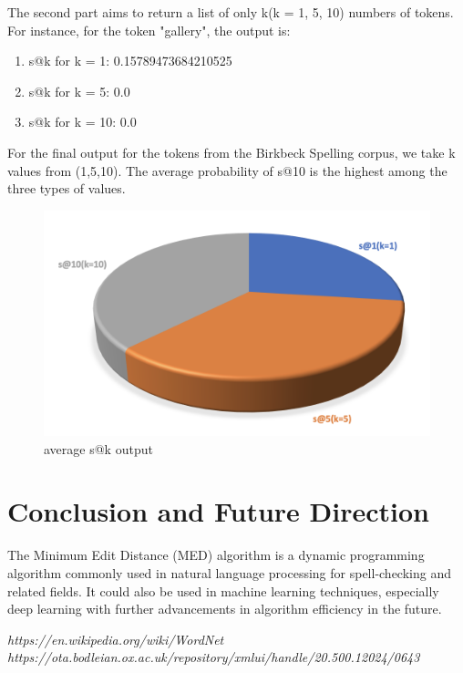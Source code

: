 \documentclass[sigconf]{acmart}
\begin{document}
The second part aims to return a list of only k(k = 1, 5, 10) numbers of tokens. For instance, for the token "gallery", the output is:
\begin{enumerate}
    \item s@k for k = 1:  0.15789473684210525
    \item s@k for k = 5:  0.0
    \item s@k for k = 10:  0.0
\end{enumerate}

For the final output for the tokens from the Birkbeck Spelling corpus, we take k values from (1,5,10). The average probability of s@10 is the highest among the three types of values.

\begin{figure}[h]
    \centering
    \includegraphics[width=0.7\linewidth]{final_res.png}
    \caption{average s@k output}
    \label{fig:enter-label}
\end{figure}

\section{Conclusion and Future Direction}
The Minimum Edit Distance (MED) algorithm is a dynamic programming algorithm commonly used in natural language processing for spell-checking and related fields. It could also be used in machine learning techniques, especially deep learning with further advancements in algorithm efficiency in the future.


 
\textit{https://en.wikipedia.org/wiki/WordNet}\\
\textit{https://ota.bodleian.ox.ac.uk/repository/xmlui/handle/20.500.12024/0643}
\end{document}
